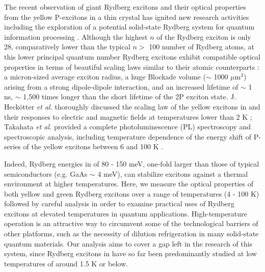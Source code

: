 \documentclass[aps,reprint,amsmath,amssymb,prb]{revtex4-1}
\begin{document}
The recent observation of giant Rydberg excitons and their optical properties from the yellow P-excitons in a thin  crystal \cite{Kazimierczuk2014} has ignited new research activities including the exploration of a potential solid-state Rydberg system for quantum information processing \cite{Khazali2017,Heckoetter2020,Ziemkiewicz2020a,Ziemkiewicz2020b}. 
Although the highest $n$ of the Rydberg exciton is only 28, comparatively lower than the typical $n >$ 100 number of Rydberg atoms, at this lower principal quantum number Rydberg excitons exhibit compatible optical properties in terms of beautiful scaling laws similar to their atomic counterparts \cite{Kazimierczuk2014,Heckotter2017,Zielinska-Raczynska2016,Schweiner2017,Heckotter2017,Kitamura2017,Schone2017,Semina2018,Stolz2018,Takahata2018}: a micron-sized average exciton radius, a huge Blockade volume ($\sim$ 1000 $\mu$m$^3$) arising from a strong dipole-dipole interaction, and an increased lifetime of $\sim$ 1 ns, $\sim$ 1,500 times longer than the short lifetime of the 2P exciton state. 
J. Heck{\"{o}}tter \emph{et al.} thoroughly discussed the scaling law of the yellow excitons in  and their responses to electric and magnetic fields at temperatures lower than 2 K \cite{Heckotter2017}; Takahata \emph{et al.} provided a complete photoluminescence (PL) spectroscopy and spectroscopic analysis, including temperature dependence of the energy shift of P-series of the yellow excitons between 6 and 100 K \cite{Takahata2018}. 

Indeed, Rydberg energies in  of 80 - 150 meV, one-fold larger than those of typical semiconductors (e.g. GaAs $\sim$ 4 meV), can stabilize excitons against a thermal environment at higher temperatures. Here, we measure the optical properties of both yellow and green Rydberg excitons over a range of temperatures (4 - 100 K) followed by careful analysis in order to examine practical uses of  Rydberg excitons at elevated temperatures in quantum applications. High-temperature operation is an attractive way to circumvent some of the technological barriers of other platforms, such as the necessity of dilution refrigeration in many solid-state quantum materials. Our analysis aims to cover a gap left in the research of this system, since Rydberg excitons in  have so far been predominantly studied at low temperatures of around 1.5 K or below. 
\end{document}
